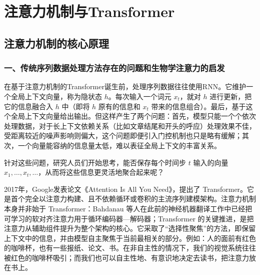 \hypertarget{ux6ce8ux610fux529bux673aux5236ux4e0etransformer}{%
\chapter{注意力机制与Transformer}\label{ux6ce8ux610fux529bux673aux5236ux4e0etransformer}}

\hypertarget{ux6ce8ux610fux529bux673aux5236ux7684ux6838ux5fc3ux539fux7406}{%
\section{注意力机制的核心原理}\label{ux6ce8ux610fux529bux673aux5236ux7684ux6838ux5fc3ux539fux7406}}

\hypertarget{ux4e00ux4f20ux7edfux5e8fux5217ux6570ux636eux5904ux7406ux65b9ux6cd5ux5b58ux5728ux7684ux95eeux9898ux548cux751fux7269ux5b66ux6ce8ux610fux529bux7684ux542fux53d1}{%
\subsection{一、传统序列数据处理方法存在的问题和生物学注意力的启发}\label{ux4e00ux4f20ux7edfux5e8fux5217ux6570ux636eux5904ux7406ux65b9ux6cd5ux5b58ux5728ux7684ux95eeux9898ux548cux751fux7269ux5b66ux6ce8ux610fux529bux7684ux542fux53d1}}

在基于注意力机制的Transformer诞生前，处理序列数据往往使用RNN。它维护一个全局上下文向量，称为隐状态 \(h\)。每次输入一个词元 \(x_t\)，就对 \(h\) 进行更新，把它的信息融合入 \(h\) 中（即将 \(h\) 原有的信息和 \(x_t\) 带来的信息组合）。最后，基于这个全局上下文向量给出输出。但这样产生了两个问题：首先，模型只能一个个依次处理数据，对于长上下文依赖关系（比如文章结尾和开头的呼应）处理效果不佳，受距离较近的噪声影响则偏大，这个问题即便引入门控机制也只是略有缓解；其次，一个向量能容纳的信息量太低，难以表征全局上下文的丰富关系。

针对这些问题，研究人员们开始思考，能否保存每个时间步 \(t\) 输入的向量 \(x_1,\ldots,x_t,\ldots\)，从而将这些信息更灵活地聚合起来呢？

2017年，Google发表论文《Attention Is All You Need》，提出了 Transformer。它是首个完全以注意力构建、且不依赖循环或卷积的主流序列建模架构。注意力机制本身并非始于 Transformer：Bahdanau 等人在此前的神经机器翻译工作中已经把可学习的软对齐注意力用于循环编码器---解码器；Transformer 的关键推进，是把注意力从辅助组件提升为整个架构的核心。它采取了``选择性聚焦''的方法，即保留上下文中的信息，并由模型自主聚焦于当前最相关的部分。例如：人的面前有红色的咖啡杯，也有一些报纸、论文、书。在非自主性的情况下，我们的视觉系统往往被红色的咖啡杯吸引；而我们也可以自主性地、有意识地决定去读书，把注意力放在书上。


